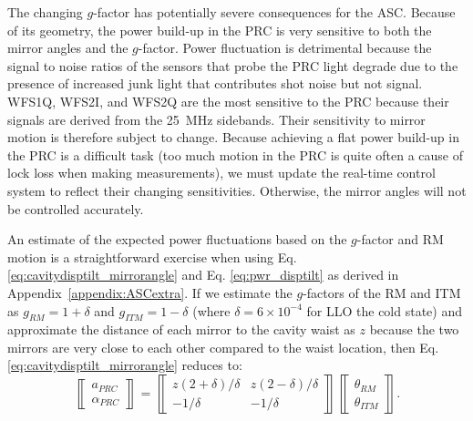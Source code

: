 The changing $g$-factor has potentially severe consequences
for the ASC. Because of its geometry, the power build-up in the PRC is
very sensitive to both the mirror angles and the $g$-factor. Power
fluctuation is detrimental because the signal to noise ratios of the
sensors that probe the PRC light degrade due to the presence of
increased junk light that contributes shot noise but not
signal. WFS1Q, WFS2I, and WFS2Q are the most sensitive to the PRC
because their signals are derived from the 25~MHz sidebands. Their
sensitivity to mirror motion is therefore subject to change. Because
achieving a flat power build-up in the PRC is a difficult task (too
much motion in the PRC is quite often a cause of lock loss when making
measurements), we must update the real-time control system to reflect
their changing sensitivities. Otherwise, the mirror angles will not be
controlled accurately.

An estimate of the expected power fluctuations based on the $g$-factor
and RM motion is a straightforward exercise when using
Eq. \ref{eq:cavitydisptilt_mirrorangle} and Eq. \ref{eq:pwr_disptilt}
as derived in Appendix~\ref{appendix:ASCextra}. If we estimate the
$g$-factors of the RM and ITM as $g_{RM} = 1+\delta$ and $g_{ITM} = 1
- \delta$ (where $\delta =6 \times 10^{-4}$ for LLO the cold state)
and approximate the distance of each mirror to the cavity waist as $z$
because the two mirrors are very close to each other compared to the
waist location, then Eq. \ref{eq:cavitydisptilt_mirrorangle} reduces
to:
\begin{equation}
\left\llbracket \begin{array}{c}
a_{PRC} \\
\alpha_{PRC} \end{array} \right\rrbracket = 
\left\llbracket \begin{array}{cc}
z(2+\delta)/\delta & z(2-\delta)/\delta \\
-1/\delta & -1/\delta \end{array} \right\rrbracket
\left\llbracket \begin{array}{c}
\theta_{RM}\\
\theta_{ITM} \end{array} \right\rrbracket.
\end{equation}


